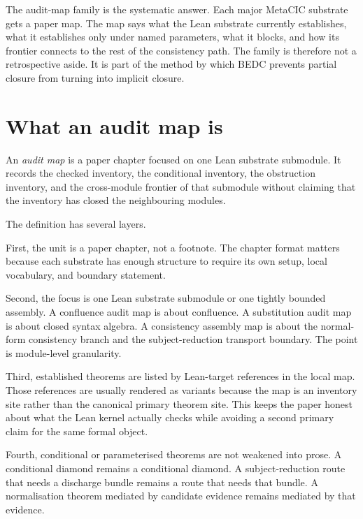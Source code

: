 The audit-map family is the systematic answer. Each major MetaCIC substrate
gets a paper map. The map says what the Lean substrate currently establishes,
what it establishes only under named parameters, what it blocks, and how its
frontier connects to the rest of the consistency path. The family is therefore
not a retrospective aside. It is part of the method by which BEDC prevents
partial closure from turning into implicit closure.

\section{What an audit map is}
\label{sec:audit-map-family-what-map-is}

\begin{definition}
\label{def:audit-map-family-audit-map}
An \emph{audit map} is a paper chapter focused on one Lean substrate
submodule. It records the checked inventory, the conditional inventory, the
obstruction inventory, and the cross-module frontier of that submodule without
claiming that the inventory has closed the neighbouring modules.
\end{definition}

The definition has several layers.

First, the unit is a paper chapter, not a footnote. The chapter format matters
because each substrate has enough structure to require its own setup, local
vocabulary, and boundary statement.

Second, the focus is one Lean substrate submodule or one tightly bounded
assembly. A confluence audit map is about confluence. A substitution audit map
is about closed syntax algebra. A consistency assembly map is about the
normal-form consistency branch and the subject-reduction transport boundary.
The point is module-level granularity.

Third, established theorems are listed by Lean-target references in the local
map. Those references are usually rendered as variants because the map is an
inventory site rather than the canonical primary theorem site. This keeps the
paper honest about what the Lean kernel actually checks while avoiding a second
primary claim for the same formal object.

Fourth, conditional or parameterised theorems are not weakened into prose. A
conditional diamond remains a conditional diamond. A subject-reduction route
that needs a discharge bundle remains a route that needs that bundle. A
normalisation theorem mediated by candidate evidence remains mediated by that
evidence.

